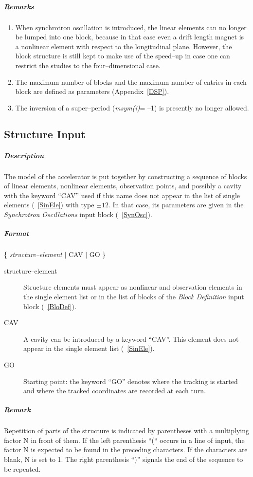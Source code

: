 \documentclass[a4paper,11pt]{report}
\begin{document}
\subparagraph{Remarks}
\begin{enumerate}
\item When synchrotron oscillation is introduced, the linear elements
  can no longer be lumped into one block, because in that case even a
  drift length magnet is a nonlinear element with respect to the
  longitudinal plane. However, the block structure is still kept to
  make use of the speed--up in case one can restrict the studies to
  the four--dimensional case.
\item The maximum number of blocks and the maximum number of entries
  in each block are defined as parameters (Appendix~\ref{DSP}).
\item The inversion of a super--period ({\em msym(i)}\/= --1) is
  presently no longer allowed.
\end{enumerate}

\subsection{Structure Input} \label{StrInp}

\subparagraph{Description} The model of the accelerator is put
together by constructing a sequence of blocks of linear elements,
nonlinear elements, observation points, and possibly a cavity with the
keyword ``CAV'' used if this name does not appear in the list of
single elements (~\ref{SinEle}) with type $\pm 12$. In that case, its
parameters are given in the {\em Synchrotron Oscillations} \/input
block (~\ref{SynOsc}).

\subparagraph{Format} \{ {\em structure--element} \/$\vert$ CAV
$\vert$ GO \}

\begin{description}
\item [structure--element] Structure elements must appear as nonlinear
  and observation elements in the single element list or in the list
  of blocks of the {\em Block Definition} \/input block
  (~\ref{BloDef}).
\item [CAV] A cavity can be introduced by a keyword ``CAV''.
  This element does not appear in the single element list
  (~\ref{SinEle}).
\item [GO] Starting point: the keyword ``GO'' denotes where the
  tracking is started and where the tracked coordinates are recorded
  at each turn.
\end{description}

\subparagraph{Remark} Repetition of parts of the structure is
indicated by parentheses with a multiplying factor N in front of them.
If the left parenthesis ``(`` occurs in a line of input, the factor N
is expected to be found in the preceding characters. If the characters
are blank, N is set to 1.  The right parenthesis ``)'' signals the end
of the sequence to be repeated.
\end{document}
